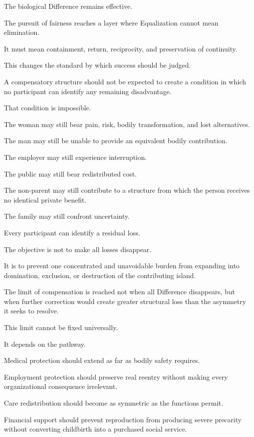 The biological Difference remains effective.

The pursuit of fairness reaches a layer where Equalization cannot mean elimination.

It must mean containment, return, reciprocity, and preservation of continuity.

This changes the standard by which success should be judged.

A compensatory structure should not be expected to create a condition in which no participant can identify any remaining disadvantage.

That condition is impossible.

The woman may still bear pain, risk, bodily transformation, and lost alternatives.

The man may still be unable to provide an equivalent bodily contribution.

The employer may still experience interruption.

The public may still bear redistributed cost.

The non-parent may still contribute to a structure from which the person receives no identical private benefit.

The family may still confront uncertainty.

Every participant can identify a residual loss.

The objective is not to make all losses disappear.

It is to prevent one concentrated and unavoidable burden from expanding into domination, exclusion, or destruction of the contributing island.

The limit of compensation is reached not when all Difference disappears, but when further correction would create greater structural loss than the asymmetry it seeks to resolve.

This limit cannot be fixed universally.

It depends on the pathway.

Medical protection should extend as far as bodily safety requires.

Employment protection should preserve real reentry without making every organizational consequence irrelevant.

Care redistribution should become as symmetric as the functions permit.

Financial support should prevent reproduction from producing severe precarity without converting childbirth into a purchased social service.

